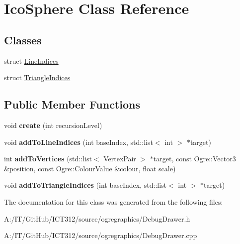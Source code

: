 \hypertarget{class_ico_sphere}{\section{Ico\-Sphere Class Reference}
\label{class_ico_sphere}
}
\subsection*{Classes}
\begin{DoxyCompactItemize}
\item 
struct \hyperlink{struct_ico_sphere_1_1_line_indices}{Line\-Indices}
\item 
struct \hyperlink{struct_ico_sphere_1_1_triangle_indices}{Triangle\-Indices}
\end{DoxyCompactItemize}
\subsection*{Public Member Functions}
\begin{DoxyCompactItemize}
\item 
\hypertarget{class_ico_sphere_a5b1db233e62838146ead7c3d838b24c4}{void {\bfseries create} (int recursion\-Level)}\label{class_ico_sphere_a5b1db233e62838146ead7c3d838b24c4}

\item 
\hypertarget{class_ico_sphere_ac39677216ad01911484b808e12c61b54}{void {\bfseries add\-To\-Line\-Indices} (int base\-Index, std\-::list$<$ int $>$ $\ast$target)}\label{class_ico_sphere_ac39677216ad01911484b808e12c61b54}

\item 
\hypertarget{class_ico_sphere_af1b260dd184f18e50dd00d6f8bd1a6e2}{int {\bfseries add\-To\-Vertices} (std\-::list$<$ Vertex\-Pair $>$ $\ast$target, const Ogre\-::\-Vector3 \&position, const Ogre\-::\-Colour\-Value \&colour, float scale)}\label{class_ico_sphere_af1b260dd184f18e50dd00d6f8bd1a6e2}

\item 
\hypertarget{class_ico_sphere_af4bbaf3ab2a0d645d565c52c540a2a39}{void {\bfseries add\-To\-Triangle\-Indices} (int base\-Index, std\-::list$<$ int $>$ $\ast$target)}\label{class_ico_sphere_af4bbaf3ab2a0d645d565c52c540a2a39}

\end{DoxyCompactItemize}


The documentation for this class was generated from the following files\-:\begin{DoxyCompactItemize}
\item 
A\-:/\-I\-T/\-Git\-Hub/\-I\-C\-T312/source/ogregraphics/Debug\-Drawer.\-h\item 
A\-:/\-I\-T/\-Git\-Hub/\-I\-C\-T312/source/ogregraphics/Debug\-Drawer.\-cpp\end{DoxyCompactItemize}
